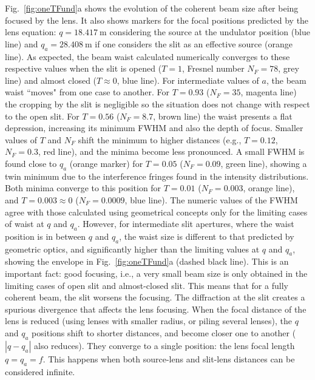 \documentclass[doublecol]{epl2}
\newcommand{\inred}[1]{{\color{black}#1}} %
\begin{document}
Fig.~\ref{fig:oneTFund}a shows the evolution of the coherent beam size after being focused by the lens. It also shows markers for the focal positions predicted by the lens equation:  $q=\SI{18.417}{\meter}$ considering the source at the undulator position (blue line) and $q_a=\SI{28.408}{\meter}$ if one considers the slit as an effective source (orange line). As expected, the beam waist calculated numerically converges to these respective values when the slit is opened ($T=1$, Fresnel number $N_F=78$, grey line) and almost closed ($T\approx0$, blue line). For intermediate values of $a$, the beam waist ``moves" from one case to another. For $T=0.93$ ($N_F=35$, magenta line) the cropping by the slit is negligible so \inred{the} situation does not change with respect \inred{to} the open slit. For $T=0.56$ ($N_F=8.7$, brown line) the waist presents a flat depression, increasing its minimum FWHM and also the depth of focus. Smaller values of $T$ and $N_F$ shift the minimum to higher distances (e.g., $T=0.12$, $N_F=0.3$,  red line)\inred{,} and the minima become less pronounced. A small FWHM is found close to $q_a$ (orange marker) for $T=0.05$ ($N_F=0.09$, green line), showing a twin minimum due to the interference fringes found in the intensity distributions. Both minima converge to this position for $T=0.01$ ($N_F=0.003$, orange line), and $T=0.003\approx0$ ($N_F=0.0009$, blue line). 
The numeric values of the FWHM agree with those calculated using geometrical concepts only for the limiting cases of waist at $q$ and $q_a$. 
However, for intermediate slit apertures, where the waist position is in between $q$ and $q_a$, the waist size is different to that predicted by geometric optics, and significantly higher \inred{than} the limiting values at $q$ and $q_a$, showing the envelope in Fig.~\ref{fig:oneTFund}a (dashed black line).
This is an important fact: good focusing, i.e., a very small beam size is only obtained in the limiting cases of open slit and almost-closed slit. This means that for a fully coherent beam, the slit worsens the focusing. The diffraction at the slit creates a spurious divergence that affects the lens focusing. 
When the focal distance of the lens is reduced (using lenses with smaller radius, or piling several lenses), the $q$ and $q_a$ positions shift to shorter distances, and become closer one to another ($|q-q_a|$ also reduces). They converge to a single position: the lens focal length $q=q_a=f$. This happens when both source-lens and slit-lens distances can be considered infinite.
\end{document}
